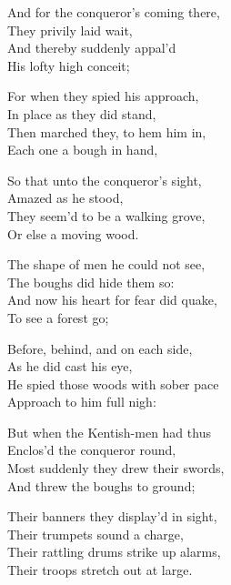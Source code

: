 \begin{dcverse}
\begin{altverse}
And for the conqueror’s coming there,\\
They privily laid wait,\\
And thereby suddenly appal'd\\
His lofty high conceit;
\end{altverse}

\begin{altverse}
For when they spied his approach,\\
In place as they did stand,\\
Then marched they, to hem him in,\\
Each one a bough in hand,
\end{altverse}

\begin{altverse}
So that unto the conqueror’s sight,\\
Amazed as he stood,\\
They seem’d to be a walking grove,\\
Or else a moving wood.
\end{altverse}

\begin{altverse}
The shape of men he could not see,\\
The boughs did hide them so:\\
And now his heart for fear did quake,\\
To see a forest go;
\end{altverse}

\begin{altverse}
Before, behind, and on each side,\\
As he did cast his eye,\\
He spied those woods with sober pace\\
Approach to him full nigh:
\end{altverse}

\begin{altverse}
But when the Kentish-men had thus\\
Enclos’d the conqueror round,\\
Most suddenly they drew their swords,\\
And threw the boughs to ground;
\end{altverse}

\begin{altverse}
Their banners they display’d in sight,\\
Their trumpets sound a charge,\\
Their rattling drums strike up alarms,\\
Their troops stretch out at large.
\end{altverse}


\end{dcverse}
